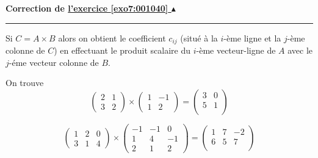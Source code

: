 \documentclass[11pt,a4paper]{article}
\newcounter{exo}
\newcommand{\correction}[1]{\hypertarget{cor7:#1}{}\label{cor7:#1}{\bf Correction de \hyperlink{exo7:#1}{l'exercice \ref{exo7:#1} $\blacktriangle$}}\vspace{1mm}\hrule\vspace{1mm}}
\begin{document}
\newpage

\correction{001040}
Si $C = A \times B$ alors on obtient le coefficient $c_{ij}$ (situé à la $i$-ème ligne et la $j$-ème colonne
de $C$) en effectuant le produit scalaire du $i$-ème vecteur-ligne de $A$ avec le $j$-éme vecteur colonne de $B$.

On trouve  
$$\left( \begin{array}{cc} 2 & 1  \\ 3& 2 \end{array} \right)\times
 \left( \begin{array}{cc}1 & -1  \\ 1& 2 \end{array} \right)
= \begin{pmatrix}
  3 & 0 \\
  5 & 1 \\  
  \end{pmatrix}$$

$$\left( \begin{array}
 {ccc} 1 & 2 & 0  \\ 3 & 1 & 4 \end{array} \right) 
\times
\left( \begin{array}{ccc} -1 &-1& 0 \\ 1 & 4 & -1 \\ 2 & 1 & 2\end{array} \right)
= \begin{pmatrix}
  1 & 7 & -2 \\
  6 & 5 & 7 \\ 
  \end{pmatrix}$$
\end{document}
